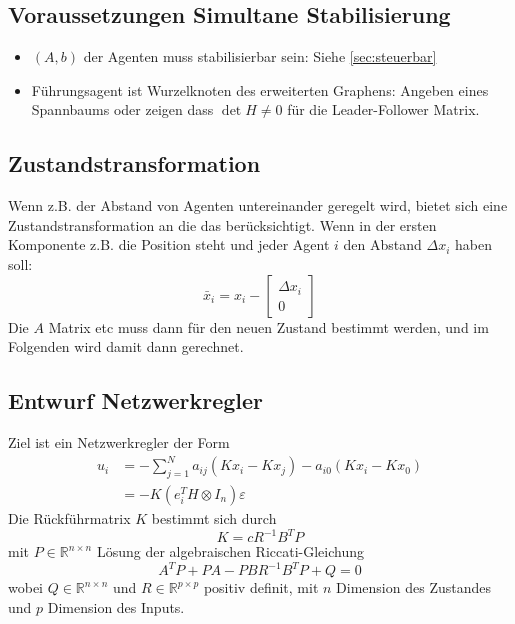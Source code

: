 \subsection{Voraussetzungen Simultane Stabilisierung}
\begin{itemize}
    \item $(A,b)$ der Agenten muss stabilisierbar sein: Siehe \ref{sec:steuerbar}
    \item Führungsagent ist Wurzelknoten des erweiterten Graphens:
          Angeben eines Spannbaums oder zeigen dass $\det H \neq 0$
          für die Leader-Follower Matrix.
\end{itemize}

\subsection{Zustandstransformation}
Wenn z.B. der Abstand von Agenten untereinander geregelt wird, bietet sich eine
Zustandstransformation an die das berücksichtigt. Wenn in der ersten Komponente
z.B. die Position steht und jeder Agent $i$ den Abstand $\Delta x_i$ haben soll:
\begin{equation}
    \bar{x}_i = x_i - \begin{bmatrix}
        \Delta x_i \\ 0
    \end{bmatrix}
\end{equation}
Die $A$ Matrix etc muss dann für den neuen Zustand bestimmt werden, und im Folgenden
wird damit dann gerechnet.


\subsection{Entwurf Netzwerkregler}
\label{sec:lf_nw_regler_entwurf}
Ziel ist ein Netzwerkregler der Form
\begin{align}
    u_i &= -\sum_{j=1}^N a_{ij} (Kx_i - Kx_j) - a_{i0} (Kx_i - Kx_0) \\
        &= -K(e_i^T H \otimes I_n)\varepsilon
\end{align}
Die Rückführmatrix $K$ bestimmt sich durch
\begin{equation}
    K=c R^{-1} B^T P
\end{equation}
mit $P \in \mathbb{R}^{n\times n}$ Lösung der algebraischen Riccati-Gleichung
\begin{equation}
    \tag{ARE}
    A^T P + P A - P B R^{-1} B^T P + Q = 0
\end{equation}
wobei $Q \in \mathbb{R}^{n\times n}$ und $R \in \mathbb{R}^{p\times p}$
positiv definit, mit $n$ Dimension des Zustandes und $p$ Dimension des
Inputs.

